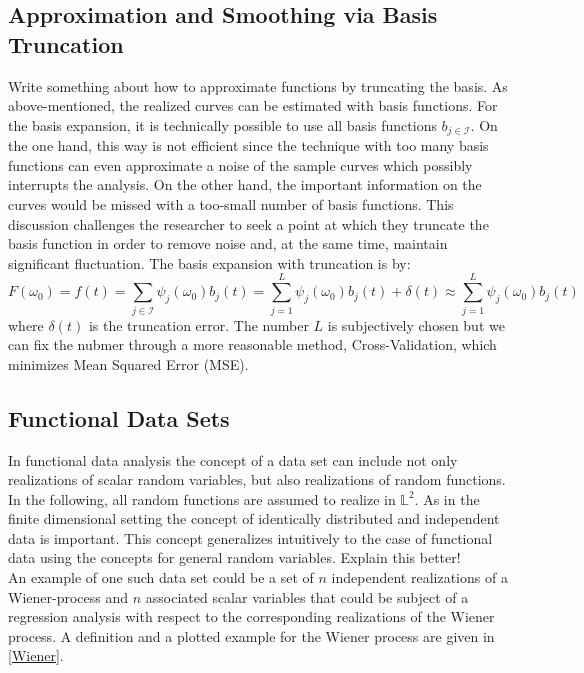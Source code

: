 \documentclass[11pt,twoside,a4paper]{article}
\begin{document}
	
	\subsection{Approximation and Smoothing via Basis Truncation}
	{\color{red} Write something about how to approximate functions by truncating the basis.}
	As above-mentioned, the realized curves can be estimated with basis functions. For the basis expansion, it is technically possible to use all basis functions $b_{j \in \mathcal{I}}$. On the one hand, this way is not efficient since the technique with too many basis functions can even approximate a noise of the sample curves which possibly interrupts the analysis. On the other hand, the important information on the curves would be missed with a too-small number of basis functions. This discussion challenges the researcher to seek a point at which they truncate the basis function in order to remove noise and, at the same time, maintain significant fluctuation. The basis expansion with truncation is by:
	\begin{equation}
		F(\omega_0) = f(t) = \sum_{j \in \mathcal{I}} \psi_j(\omega_0) b_j(t) = \sum_{j = 1}^{L} \psi_j(\omega_0) b_j(t) + \delta(t) \approx \sum_{j = 1}^{L} \psi_j(\omega_0) b_j(t)
	\end{equation}
	where $\delta(t)$ is the truncation error. The number $L$ is subjectively chosen but we can fix the nubmer through a more reasonable method, Cross-Validation, which minimizes Mean Squared Error (MSE). 
	
	\subsection{Functional Data Sets}
	In functional data analysis the concept of a data set can include not only realizations of scalar random variables, but also realizations of random functions. In the following, all random functions are assumed to realize in $\mathbb{L}^2$. As in the finite dimensional setting the concept of identically distributed and independent data is important. This concept generalizes intuitively to the case of functional data using the concepts for general random variables. {\color{red} Explain this better!}\\
	An example of one such data set could be a set of $n$ independent realizations of a Wiener-process and $n$ associated scalar variables that could be subject of a regression analysis with respect to the corresponding realizations of the Wiener process. A definition and a plotted example for the Wiener process are given in \ref{Wiener}.
	
\end{document}
